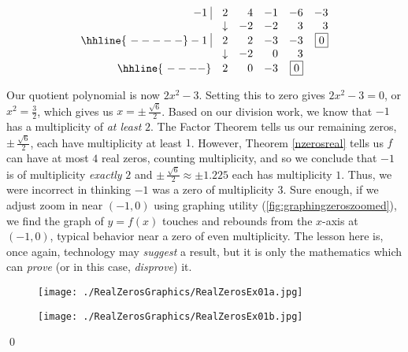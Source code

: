 \begin{ex}
\begin{enumerate}
\[\begin{array}{rrrrrr}
 -1 \, \, \vline& 2 & 4 & -1  & -6 & -3 \\

  & \downarrow     &  -2  &  -2  & 3 & 3\\ \hhline{~-----} 
  
  -1 \, \, \vline&  2 &   2  & -3 & -3 &  \fbox{$0$}  \\
    
               & \downarrow &  -2  &  0  & 3 &\\ \hhline{~----} 
 
   & 2  &   0  & -3& \fbox{0} &   \\
  
        

\end{array}\]

 Our quotient polynomial is now $2x^2 - 3$.  Setting this to zero gives $2x^2 - 3 = 0$, or $x^2 = \frac{3}{2}$, which gives us $x = \pm \, \frac{\sqrt{6}}{2}$.  Based on our division work, we know that $-1$ has a multiplicity of \textit{at least} $2$. The Factor Theorem tells us our remaining zeros, $\pm \, \frac{\sqrt{6}}{2}$, each have multiplicity at least $1$.  However, Theorem \ref{nzerosreal} tells us $f$ can have at most $4$ real zeros, counting multiplicity, and so we conclude that $-1$ is of multiplicity \textit{exactly} $2$ and $\pm \, \frac{\sqrt{6}}{2} \approx \pm 1.225$ each has multiplicity $1$. Thus, we were incorrect in thinking  $-1$ was a zero of multiplicity $3$.  Sure enough, if we adjust zoom in near $(-1,0)$ using graphing utility (\autoref{fig:graphingzeroszoomed}), we find the graph of $y = f(x)$ touches and rebounds from the $x$-axis at $(-1,0)$, typical behavior near a zero of even multiplicity. The lesson here is, once again, technology may \textit{suggest} a result, but it is only the mathematics which can \textit{prove} (or in this case, \textit{disprove}) it.  

\end{enumerate}

\begin{figure}
\begin{center}

\texttt{[image: ./RealZerosGraphics/RealZerosEx01a.jpg]}

\caption{}
\label{fig:graphingzeros}
\end{center}
\end{figure}

\begin{figure}
\begin{center}
  
\texttt{[image: ./RealZerosGraphics/RealZerosEx01b.jpg]}
\caption{}
\label{fig:graphingzeroszoomed}
\end{center}
\end{figure}

 \qed

\end{ex}


